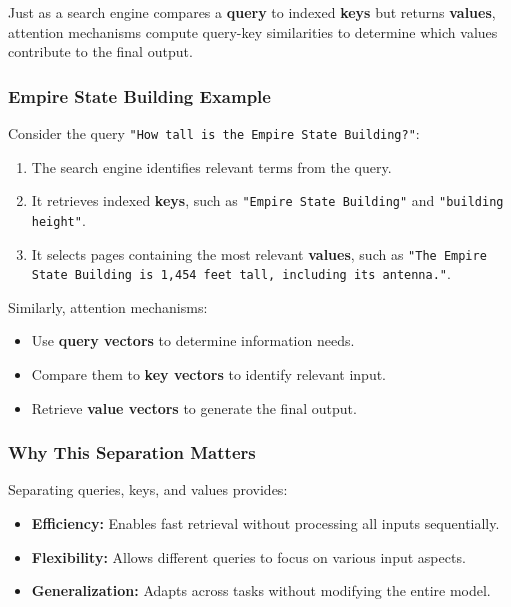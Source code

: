 \noindent Just as a search engine compares a \textbf{query} to indexed \textbf{keys} but returns \textbf{values}, attention mechanisms compute query-key similarities to determine which values contribute to the final output.

\subsubsection{Empire State Building Example}

\noindent Consider the query \texttt{"How tall is the Empire State Building?"}:

\begin{enumerate}
    \item The search engine identifies relevant terms from the query.
    \item It retrieves indexed \textbf{keys}, such as \texttt{"Empire State Building"} and \texttt{"building height"}.
    \item It selects pages containing the most relevant \textbf{values}, such as \texttt{"The Empire State Building is 1,454 feet tall, including its antenna."}.
\end{enumerate}

\noindent Similarly, attention mechanisms:

\begin{itemize}
    \item Use \textbf{query vectors} to determine information needs.
    \item Compare them to \textbf{key vectors} to identify relevant input.
    \item Retrieve \textbf{value vectors} to generate the final output.
\end{itemize}

\subsubsection{Why This Separation Matters}

\noindent Separating queries, keys, and values provides:

\begin{itemize}
    \item \textbf{Efficiency:} Enables fast retrieval without processing all inputs sequentially.
    \item \textbf{Flexibility:} Allows different queries to focus on various input aspects.
    \item \textbf{Generalization:} Adapts across tasks without modifying the entire model.
\end{itemize}


